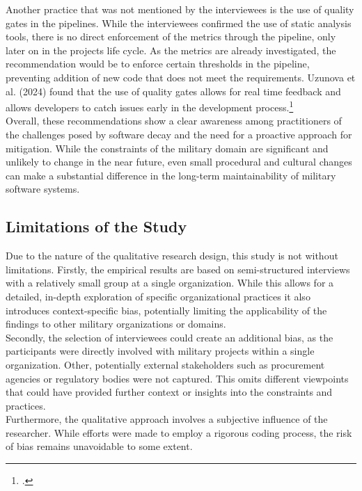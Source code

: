 Another practice that was not mentioned by the interviewees is the use of quality gates in the pipelines. While the interviewees confirmed the use of static analysis tools, there is no direct enforcement of the metrics through the pipeline, only later on in the projects life cycle.
As the metrics are already investigated, the recommendation would be to enforce certain thresholds in the pipeline, preventing addition of new code that does not meet the requirements. Uzunova et al. (2024) found that the use of quality gates allows for real time feedback and allows developers to catch issues early in the development process.\footcite[8]{uzunovaQualityGatesSoftware2024}\\

Overall, these recommendations show a clear awareness among practitioners of the challenges posed by software decay and the need for a proactive approach for mitigation. While the constraints of the military domain are significant and unlikely to change in the near future, even small procedural and 
cultural changes can make a substantial difference in the long-term maintainability of military software systems.\\

\subsection{Limitations of the Study}
Due to the nature of the qualitative research design, this study is not without limitations. Firstly, the empirical results are based on semi-structured interviews with a relatively small group at a single organization.
While this allows for a detailed, in-depth exploration of specific organizational practices it also introduces context-specific bias, potentially limiting the applicability of the findings to other military organizations or domains.\\

Secondly, the selection of interviewees could create an additional bias, as the participants were directly involved with military projects within a single organization. Other, potentially external stakeholders such as procurement agencies
or regulatory bodies were not captured. This omits different viewpoints that could have provided further context or insights into the constraints and practices.\\

Furthermore, the qualitative approach involves a subjective influence of the researcher. While efforts were made to employ a rigorous coding process, the risk of bias remains unavoidable to some extent.\\

